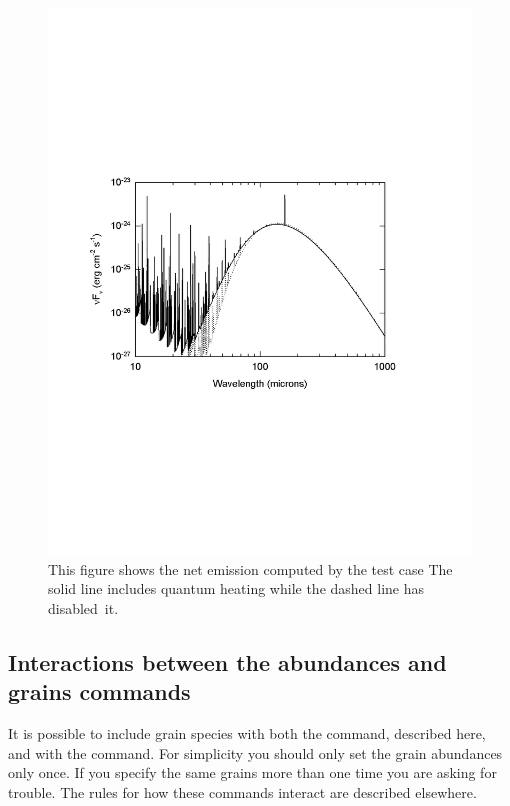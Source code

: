 \begin{figure}
\centering
\includegraphics{grains_qheat}
\caption[Quantum heating]{\label{fig:grains_qheat}This figure shows the
net emission computed by the test case
The solid line includes quantum heating while the dashed
line has disabled~it.}
\end{figure}

\subsection{Interactions between the abundances and grains commands}

It is possible to include grain species with both the
 command,
described here, and with the  command.
For simplicity you should only set the grain abundances
only once.
If you specify the same grains more than one time you are asking
for trouble.
The rules for how these commands interact are described elsewhere.

